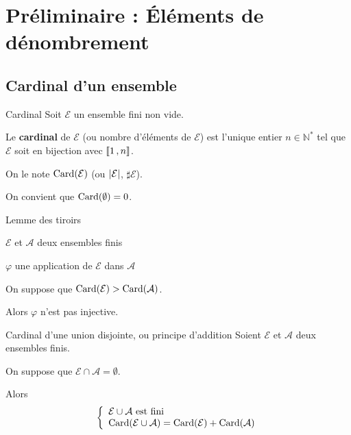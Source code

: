 
\section{Préliminaire : Éléments de dénombrement}

    \subsection{Cardinal d’un ensemble}

    \begin{defi}{Cardinal}{}
        Soit $\mathcal{E}$ un ensemble fini non vide.

        Le \textbf{cardinal} de $\mathcal{E}$ (ou nombre d’éléments de $\mathcal{E}$) est l’unique entier $n \in \mathbb{N}^*$ tel que $\mathcal{E}$ soit en bijection avec $\left\llbracket 1 \, , n \right\rrbracket$. 

        On le note $\operatorname{Card}(\mathcal{E})$ (ou $\left\lvert \mathcal{E}\right\rvert$, $\sharp \mathcal{E}$). 

        On convient que $\operatorname{Card}(\emptyset) = 0$.
    \end{defi}

    \begin{lem}{Lemme des tiroirs}{}
        \begin{soient}
            \item $\mathcal{E}$ et $\mathcal{A}$ deux ensembles finis
            \item $\varphi$ une application de $\mathcal{E}$ dans $\mathcal{A}$
        \end{soient}
        On suppose que $\operatorname{Card}(\mathcal{E}) > \operatorname{Card}(\mathcal{A})$.

        Alors $\varphi$ n’est pas injective.
    \end{lem}

    \begin{prop}{Cardinal d’une union disjointe, ou principe d’addition}{}
        Soient $\mathcal{E}$ et $\mathcal{A}$ deux ensembles finis. 

        On suppose que $\mathcal{E} \cap \mathcal{A} = \emptyset$.

        Alors 
        \[ \et{\mathcal{E} \cup \mathcal{A} \text{ est fini}}{\card(\mathcal{E} \cup \mathcal{A}) = \card(\mathcal{E}) + \card(\mathcal{A})} \]
    \end{prop}

